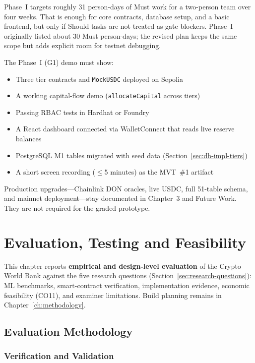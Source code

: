 \documentclass[12pt,a4paper]{report}
\begin{document}
Phase~I targets roughly 31 person-days of Must work for a two-person team over four weeks. That is enough for core contracts, database setup, and a basic frontend, but only if Should tasks are not treated as gate blockers. Phase~I originally listed about 30 Must person-days; the revised plan keeps the same scope but adds explicit room for testnet debugging.

The Phase~I (G1) demo must show:
\begin{itemize}[noitemsep]
\item Three tier contracts and \texttt{MockUSDC} deployed on Sepolia
\item A working capital-flow demo (\texttt{allocateCapital} across tiers)
\item Passing RBAC tests in Hardhat or Foundry
\item A React dashboard connected via WalletConnect that reads live reserve balances
\item PostgreSQL M1 tables migrated with seed data (Section~\ref{sec:db-impl-tiers})
\item A short screen recording ($\leq$5 minutes) as the MVT~\#1 artifact
\end{itemize}

Production upgrades---Chainlink DON oracles, live USDC, full 51-table schema, and mainnet deployment---stay documented in Chapter~3 and Future Work. They are not required for the graded prototype.



\chapter{Evaluation, Testing and Feasibility}
\label{ch:evaluation}
\label{ch:market-analysis}

This chapter reports \textbf{empirical and design-level evaluation} of the Crypto World Bank against the five research questions (Section~\ref{sec:research-questions}): ML benchmarks, smart-contract verification, implementation evidence, economic feasibility (CO11), and examiner limitations. Build planning remains in Chapter~\ref{ch:methodology}.

\section{Evaluation Methodology}
\label{sec:eval-method}

\subsection{Verification and Validation}
\label{sec:verification-validation}
\end{document}
